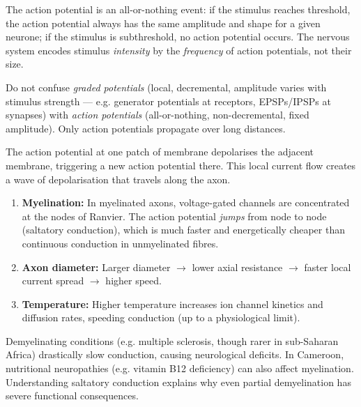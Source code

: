 \documentclass[11pt]{article}
\newcommand{\cle}[1]{{\popxbold\color{popdark}#1}}
\newcounter{popsec}
\newcounter{popsub}
\newcommand{\courssub}[1]{%
  \stepcounter{popsub}%
  \par\vspace{9pt}\noindent{\popxbold\fontsize{11.5}{13}\selectfont\color{popink}{\color{poporange}\thepopsec.\thepopsub}\hspace{6pt}#1}\par\nopagebreak\vspace{4pt}
}
\begin{document}
\begin{propriete}
The action potential is an \cle{all-or-nothing} event: if the stimulus reaches threshold, the action potential always has the same amplitude and shape for a given neurone; if the stimulus is subthreshold, no action potential occurs. The nervous system encodes stimulus \emph{intensity} by the \emph{frequency} of action potentials, not their size.
\end{propriete}

\begin{attention}
Do not confuse \emph{graded potentials} (local, decremental, amplitude varies with stimulus strength — e.g. generator potentials at receptors, EPSPs/IPSPs at synapses) with \emph{action potentials} (all-or-nothing, non-decremental, fixed amplitude). Only action potentials propagate over long distances.
\end{attention}

\courssub{Propagation of the Action Potential}

The action potential at one patch of membrane depolarises the adjacent membrane, triggering a new action potential there. This \cle{local current flow} creates a wave of depolarisation that travels along the axon.

\begin{propriete}
\begin{enumerate}
\item \textbf{Myelination:} In myelinated axons, voltage-gated channels are concentrated at the \cle{nodes of Ranvier}. The action potential \emph{jumps} from node to node (\cle{saltatory conduction}), which is much faster and energetically cheaper than continuous conduction in unmyelinated fibres.
\item \textbf{Axon diameter:} Larger diameter $\to$ lower axial resistance $\to$ faster local current spread $\to$ higher speed.
\item \textbf{Temperature:} Higher temperature increases ion channel kinetics and diffusion rates, speeding conduction (up to a physiological limit).
\end{enumerate}
\end{propriete}

\begin{savaistu}
Demyelinating conditions (e.g. multiple sclerosis, though rarer in sub-Saharan Africa) drastically slow conduction, causing neurological deficits. In Cameroon, nutritional neuropathies (e.g. vitamin B12 deficiency) can also affect myelination. Understanding saltatory conduction explains why even partial demyelination has severe functional consequences.
\end{savaistu}
\end{document}
